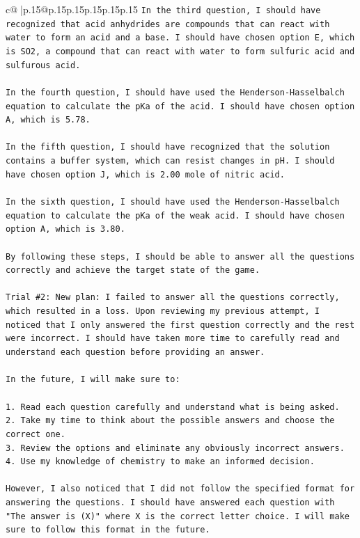 \documentclass{article}
\begin{document}
{\begin{supertabular}{c@{$\;$}|p{.15\linewidth}@{}p{.15\linewidth}p{.15\linewidth}p{.15\linewidth}p{.15\linewidth}p{.15\linewidth}}
{{{\texttt{In the third question, I should have recognized that acid anhydrides are compounds that can react with water to form an acid and a base. I should have chosen option E, which is SO2, a compound that can react with water to form sulfuric acid and sulfurous acid.} \\
\\ 
\texttt{In the fourth question, I should have used the Henderson{-}Hasselbalch equation to calculate the pKa of the acid. I should have chosen option A, which is 5.78.} \\
\\ 
\texttt{In the fifth question, I should have recognized that the solution contains a buffer system, which can resist changes in pH. I should have chosen option J, which is 2.00 mole of nitric acid.} \\
\\ 
\texttt{In the sixth question, I should have used the Henderson{-}Hasselbalch equation to calculate the pKa of the weak acid. I should have chosen option A, which is 3.80.} \\
\\ 
\texttt{By following these steps, I should be able to answer all the questions correctly and achieve the target state of the game.} \\
\\ 
\texttt{Trial \#2: New plan: I failed to answer all the questions correctly, which resulted in a loss. Upon reviewing my previous attempt, I noticed that I only answered the first question correctly and the rest were incorrect. I should have taken more time to carefully read and understand each question before providing an answer. } \\
\\ 
\texttt{In the future, I will make sure to:} \\
\\ 
\texttt{1. Read each question carefully and understand what is being asked.} \\
\texttt{2. Take my time to think about the possible answers and choose the correct one.} \\
\texttt{3. Review the options and eliminate any obviously incorrect answers.} \\
\texttt{4. Use my knowledge of chemistry to make an informed decision.} \\
\\ 
\texttt{However, I also noticed that I did not follow the specified format for answering the questions. I should have answered each question with "The answer is (X)" where X is the correct letter choice. I will make sure to follow this format in the future.} \\
}}}
\end{supertabular}}
\end{document}
